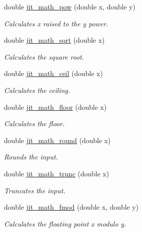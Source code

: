 \begin{DoxyCompactItemize}
double \hyperlink{group__mathmod_ga2af7bdac7c3e46f8824c929b9f6c7ca5}{jit\_\-math\_\-pow} (double x, double y)
\begin{DoxyCompactList}\small\item\em Calculates x raised to the y power. \item\end{DoxyCompactList}\item 
double \hyperlink{group__mathmod_ga325567e295cd4a024acc2868bb5ed71f}{jit\_\-math\_\-sqrt} (double x)
\begin{DoxyCompactList}\small\item\em Calculates the square root. \item\end{DoxyCompactList}\item 
double \hyperlink{group__mathmod_gaf27743b2c312d333f499b8dda5d6e5e9}{jit\_\-math\_\-ceil} (double x)
\begin{DoxyCompactList}\small\item\em Calculates the ceiling. \item\end{DoxyCompactList}\item 
double \hyperlink{group__mathmod_ga6a8abc7661ad637512d81cf1c9e6fdae}{jit\_\-math\_\-floor} (double x)
\begin{DoxyCompactList}\small\item\em Calculates the floor. \item\end{DoxyCompactList}\item 
double \hyperlink{group__mathmod_ga5b29bd3b76679c7b0b2e4594444cb4bd}{jit\_\-math\_\-round} (double x)
\begin{DoxyCompactList}\small\item\em Rounds the input. \item\end{DoxyCompactList}\item 
double \hyperlink{group__mathmod_gab6a84c39d16bc9fd8f1efbf68e696d3c}{jit\_\-math\_\-trunc} (double x)
\begin{DoxyCompactList}\small\item\em Truncates the input. \item\end{DoxyCompactList}\item 
double \hyperlink{group__mathmod_gaab62faf04da0402ad53b5a3753c8ffb5}{jit\_\-math\_\-fmod} (double x, double y)
\begin{DoxyCompactList}\small\item\em Calculates the floating point x modulo y. \item\end{DoxyCompactList}\item 

\end{DoxyCompactItemize}
